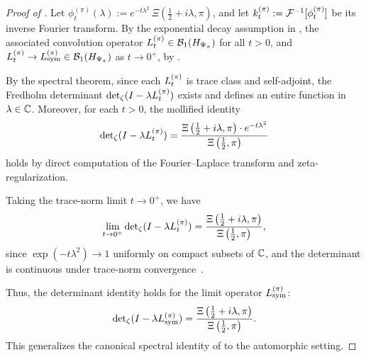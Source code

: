 \begin{proof}[Proof of ]
Let \( \phi_t^{(\pi)}(\lambda) := e^{-t\lambda^2} \, \Xi\left(\tfrac{1}{2} + i\lambda, \pi\right) \), and let \( k_t^{(\pi)} := \mathcal{F}^{-1}[\phi_t^{(\pi)}] \) be its inverse Fourier transform. By the exponential decay assumption in , the associated convolution operator \( L_t^{(\pi)} \in \mathcal{B}_1(H_{\Psi_{\pi}}) \) for all \( t > 0 \), and \( L_t^{(\pi)} \to L_{\mathrm{sym}}^{(\pi)} \in \mathcal{B}_1(H_{\Psi_{\pi}}) \) as \( t \to 0^+ \), by .

By the spectral theorem, since each \( L_t^{(\pi)} \) is trace class and self-adjoint, the Fredholm determinant \( \det\nolimits_{\zeta}(I - \lambda L_t^{(\pi)}) \) exists and defines an entire function in \( \lambda \in \mathbb{C} \). Moreover, for each \( t > 0 \), the mollified identity
\[
\det\nolimits_{\zeta}(I - \lambda L_t^{(\pi)}) = \frac{\Xi\left(\tfrac{1}{2} + i\lambda, \pi\right) \cdot e^{-t\lambda^2}}{\Xi\left(\tfrac{1}{2}, \pi\right)}
\]
holds by direct computation of the Fourier–Laplace transform and zeta-regularization.

Taking the trace-norm limit \( t \to 0^+ \), we have
\[
\lim_{t \to 0^+} \det\nolimits_{\zeta}(I - \lambda L_t^{(\pi)})
= \frac{\Xi\left(\tfrac{1}{2} + i\lambda, \pi\right)}{\Xi\left(\tfrac{1}{2}, \pi\right)},
\]
since \( \exp(-t\lambda^2) \to 1 \) uniformly on compact subsets of \( \mathbb{C} \), and the determinant is continuous under trace-norm convergence~\cite[Thm.~6.5]{Simon2005TraceIdeals}.

Thus, the determinant identity holds for the limit operator \( L_{\mathrm{sym}}^{(\pi)} \):
\[
\det\nolimits_{\zeta}(I - \lambda L_{\mathrm{sym}}^{(\pi)}) = \frac{\Xi\left(\tfrac{1}{2} + i\lambda, \pi\right)}{\Xi\left(\tfrac{1}{2}, \pi\right)}.
\]
This generalizes the canonical spectral identity of  to the automorphic setting.
\end{proof}
